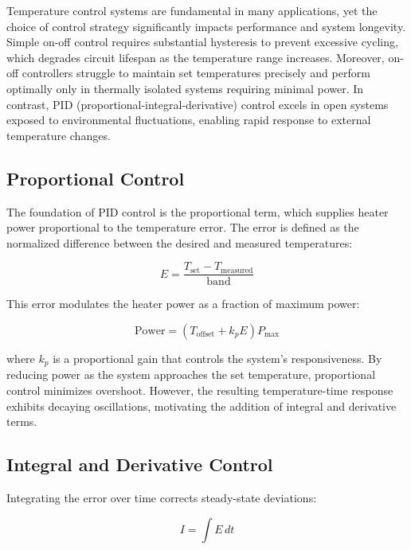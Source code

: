 Temperature control systems are fundamental in many applications, yet the
choice of control strategy significantly impacts performance and system
longevity.
Simple on-off control requires substantial hysteresis to prevent excessive
cycling, which degrades circuit lifespan as the temperature range increases.
Moreover, on-off controllers struggle to maintain set temperatures precisely
and perform optimally only in thermally isolated systems requiring minimal
power.
In contrast, PID (proportional-integral-derivative) control excels in open
systems exposed to environmental fluctuations, enabling rapid response to
external temperature changes.

\subsection{Proportional Control}
\label{subsec:proportional-control}

The foundation of PID control is the proportional term, which supplies heater
power proportional to the temperature error.
The error is defined as the normalized difference between the desired and
measured temperatures:

\begin{equation}
    E = \frac{T_{\text{set}} - T_{\text{measured}}}{\text{band}}
    \label{eq:error}
\end{equation}

This error modulates the heater power as a fraction of maximum power:

\begin{equation}
    \text{Power} = \left( T_{\text{offset}} + k_p E \right) P_{\max}
    \label{eq:power_proportional}
\end{equation}

where $k_p$ is a proportional gain that controls the system's responsiveness.
By reducing power as the system approaches the set temperature, proportional
control minimizes overshoot.
However, the resulting temperature-time response exhibits decaying
oscillations, motivating the addition of integral and derivative terms.

\subsection{Integral and Derivative Control}
\label{subsec:integral-and-derivative-control}

Integrating the error over time corrects steady-state deviations:

\begin{equation}
    I = \int E \, dt
    \label{eq:integral}
\end{equation}

